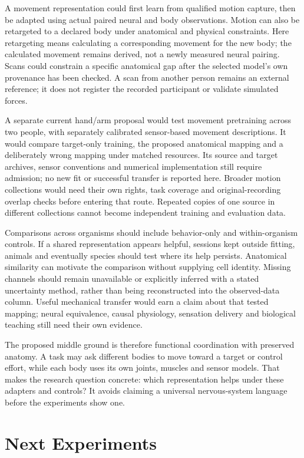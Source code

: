 A movement representation could first learn from qualified motion capture,
then be adapted using actual paired neural and body observations. Motion can
also be retargeted to a declared body under anatomical and physical constraints.
Here retargeting means calculating a corresponding movement for the new body;
the calculated movement remains derived, not a newly measured neural pairing.
Scans could constrain a specific anatomical gap after the selected model's own
provenance has been checked. A scan from another person remains an external
reference; it does not register the recorded participant or validate simulated
forces.

A separate current hand/arm proposal would test movement pretraining across
two people, with separately calibrated sensor-based movement descriptions. It
would compare target-only training, the proposed anatomical mapping and a
deliberately wrong mapping under matched resources. Its source and target
archives, sensor conventions and numerical implementation still require
admission; no new fit or successful transfer is reported here. Broader motion
collections would need their own rights, task coverage and original-recording
overlap checks before entering that route. Repeated copies of one source in
different collections cannot become independent training and evaluation data.

Comparisons across organisms should include behavior-only and within-organism controls. If a shared representation appears helpful, sessions kept outside fitting, animals and eventually species should test where its help persists. Anatomical similarity can motivate the comparison without supplying cell identity. Missing channels should remain unavailable or explicitly inferred with a stated uncertainty method, rather than being reconstructed into the observed-data column. Useful mechanical transfer would earn a claim about that tested mapping; neural equivalence, causal physiology, sensation delivery and biological teaching still need their own evidence.

The proposed middle ground is therefore functional coordination with preserved anatomy. A task may ask different bodies to move toward a target or control effort, while each body uses its own joints, muscles and sensor models. That makes the research question concrete: which representation helps under these adapters and controls? It avoids claiming a universal nervous-system language before the experiments show one.

\section{Next Experiments}

